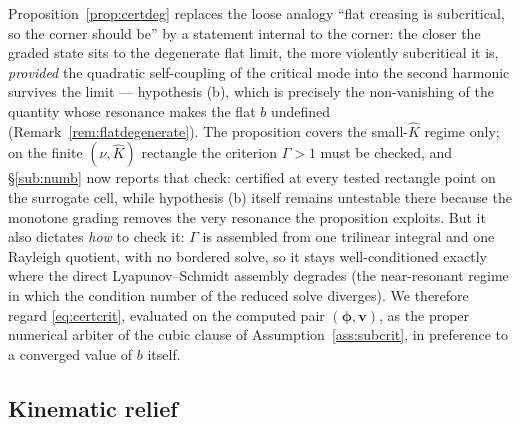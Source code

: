 \begin{remark}
    \label{rem:certnum}
    Proposition~\ref{prop:certdeg} replaces the loose analogy ``flat creasing is subcritical, so the corner should
    be'' by a statement internal to the corner: the closer the graded state sits to the degenerate flat limit, the
    more violently subcritical it is, \emph{provided} the quadratic self-coupling of the critical mode into the second
    harmonic survives the limit --- hypothesis (b), which is precisely the non-vanishing of the quantity whose
    resonance makes the flat $b$ undefined (Remark~\ref{rem:flatdegenerate}). The proposition covers the
    small-$\hat K$ regime only; on the finite $(\nu,\hat K)$ rectangle the criterion $\Gamma>1$ must be checked, and
    \S\ref{sub:numb} now reports that check: certified at every tested rectangle point on the surrogate cell, while
    hypothesis (b) itself remains untestable there because the monotone grading removes the very resonance the
    proposition exploits.
    But it also dictates \emph{how} to check it: $\Gamma$ is assembled from one trilinear integral and one Rayleigh
    quotient, with no bordered solve, so it stays well-conditioned exactly where the direct Lyapunov--Schmidt assembly
    degrades (the near-resonant regime in which the condition number of the reduced solve diverges). We therefore
    regard \eqref{eq:certcrit}, evaluated on the computed pair $(\bm{\phi},\bm{v})$, as the proper numerical arbiter
    of the cubic clause of Assumption~\ref{ass:subcrit}, in preference to a converged value of $b$ itself.
\end{remark}

\subsection{Kinematic relief}
\label{sub:reliefd}


